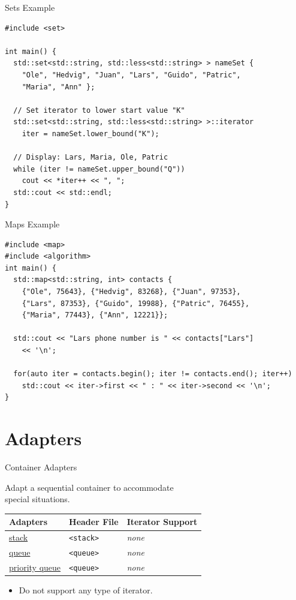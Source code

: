 \documentclass[14pt,aspectratio=1610]{beamer}
\begin{document}
\begin{frame}[fragile]{Sets Example}
\small
\begin{lstlisting}[basicstyle=\footnotesize\ttfamily]
#include <set>

int main() {
  std::set<std::string, std::less<std::string> > nameSet {
    "Ole", "Hedvig", "Juan", "Lars", "Guido", "Patric",
    "Maria", "Ann" };

  // Set iterator to lower start value "K"
  std::set<std::string, std::less<std::string> >::iterator
    iter = nameSet.lower_bound("K");

  // Display: Lars, Maria, Ole, Patric
  while (iter != nameSet.upper_bound("Q"))
    cout << *iter++ << ", ";
  std::cout << std::endl;
}
\end{lstlisting}
\end{frame}

\begin{frame}[fragile]{Maps Example}
\begin{lstlisting}[basicstyle=\footnotesize\ttfamily]
#include <map>
#include <algorithm>
int main() {
  std::map<std::string, int> contacts {
    {"Ole", 75643}, {"Hedvig", 83268}, {"Juan", 97353},
    {"Lars", 87353}, {"Guido", 19988}, {"Patric", 76455},
    {"Maria", 77443}, {"Ann", 12221}};

  std::cout << "Lars phone number is " << contacts["Lars"]
    << '\n';

  for(auto iter = contacts.begin(); iter != contacts.end(); iter++)
    std::cout << iter->first << " : " << iter->second << '\n';
}
\end{lstlisting}
\end{frame}


\section{Adapters}

\begin{frame}{Container Adapters}

Adapt a sequential container to accommodate\\ special situations.\\[1em]

\begin{tabular}{l l l}
\toprule
  \textbf{\large Adapters} & \textbf{Header File} & \textbf{Iterator Support}\\
\midrule
  \href{https://en.cppreference.com/w/cpp/container/stack}{stack}
    & \lstinline{<stack>} & \textit{none}\\
  \href{https://en.cppreference.com/w/cpp/container/queue}{queue}
    & \lstinline{<queue>} & \textit{none}\\
  \href{https://en.cppreference.com/w/cpp/container/priority_queue}{priority queue}
    & \lstinline{<queue>} & \textit{none}\\
\bottomrule
\end{tabular}

\begin{itemize}
\item
  Do not support any type of iterator.
\end{itemize}

\end{frame}
\end{document}
